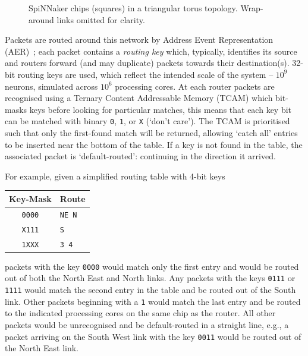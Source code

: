 \documentclass[conference]{IEEEtran}
\newcommand{\mytt}[1]{\texttt{\footnotesize#1}}
\begin{document}
\begin{figure}[!b]
  
  \center
  
  
  \caption{SpiNNaker chips (squares) in a triangular torus topology. Wrap-around links omitted for clarity.}
  \label{fig:diagrams/topology}
  
\end{figure}

Packets are routed around this network by Address Event Representation (AER)~\parencite{Boahen2000}; each packet contains a \emph{routing key} which, typically, identifies its source and routers forward (and may duplicate) packets towards their destination(s).
32-bit routing keys are used, which reflect the intended scale of the system -- $10^9$ neurons, simulated across $10^6$ processing cores.
At each router packets are recognised using a Ternary Content Addressable Memory (TCAM) which bit-masks keys before looking for particular matches,
this means that each key bit can be matched with binary \mytt{0}, \mytt{1}, or \mytt{X} (`don't care').
The TCAM is prioritised such that only the first-found match will be returned, allowing `catch all' entries to be inserted near the bottom of the table.
If a key is not found in the table, the associated packet is `default-routed': continuing in the direction it arrived.

For example, given a simplified routing table with 4-bit keys

\begin{table}[H]
  \centering
  \begin{tabular}{c l}
    \toprule
    Key-Mask & Route \\
    \midrule
    \texttt{0000} & \texttt{NE N}\\
    \texttt{X111} & \texttt{S}\\
    \texttt{1XXX} & \texttt{3 4}\\
    \bottomrule
  \end{tabular}
\end{table}

\noindent packets with the key \mytt{0000} would match only the first entry and would be routed out of both the North East and North links.
Any packets with the keys \mytt{0111} or \mytt{1111} would match the second entry in the table and be routed out of the South link.
Other packets beginning with a \mytt{1} would match the last entry and be routed to the indicated processing cores on the same chip as the router.
All other packets would be unrecognised and be default-routed in a straight line, e.g., a packet arriving on the South West link with the key \mytt{0011} would be routed out of the North East link.
\end{document}
